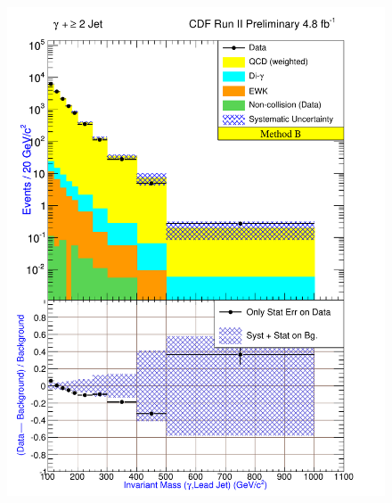 \documentclass[12pt,twoside,letterpaper,doublespace]{article}
\begin{document}
\begin{figure}[h!]
{\includegraphics[keepaspectratio=true, scale=\figScale]{G30Jets_MtdB_plot2_InvMass_pj1.pdf}}

\end{figure}
\end{document}
